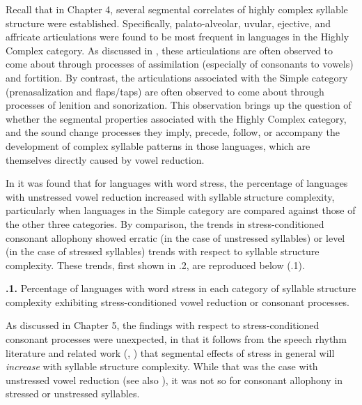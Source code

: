   Recall that in Chapter 4, several segmental correlates of highly complex syllable structure were established. Specifically, palato-alveolar, uvular, ejective, and affricate articulations were found to be most frequent in languages in the Highly Complex category. As discussed in , these articulations are often observed to come about through processes of assimilation (especially of consonants to vowels) and fortition. By contrast, the articulations associated with the Simple category (prenasalization and flaps/taps) are often observed to come about through processes of lenition and sonorization. This observation brings up the question of whether the segmental properties associated with the Highly Complex category, and the sound change processes they imply, precede, follow, or accompany the development of complex syllable patterns in those languages, which are themselves directly caused by vowel reduction.



  In  it was found that for languages with word stress, the percentage of languages with unstressed vowel reduction increased with syllable structure complexity, particularly when languages in the Simple category are compared against those of the other three categories. By comparison, the trends in stress-conditioned consonant allophony showed erratic (in the case of unstressed syllables) or level (in the case of stressed syllables) trends with respect to syllable structure complexity. These trends, first shown in .2, are reproduced below (.1).





\textbf{.1.} Percentage of languages with word stress in each category of syllable structure complexity exhibiting stress-conditioned vowel reduction or consonant processes.



As discussed in Chapter 5, the findings with respect to stress-conditioned consonant processes were unexpected, in that it follows from the speech rhythm literature and related work (\citealt{BybeeEtAl1998}, \citealt{Schiering2007}) that segmental effects of stress in general will \textit{increase} with syllable structure complexity. While that was the case with unstressed vowel reduction (see also ), it was not so for consonant allophony in stressed or unstressed syllables.



